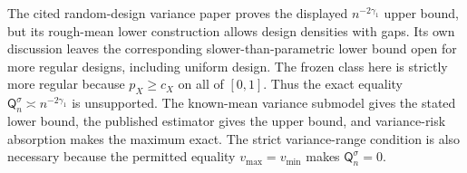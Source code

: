 The cited random-design variance paper proves the displayed \(n^{-2\gamma_1}\) upper bound, but its rough-mean lower construction allows design densities with gaps.  Its own discussion leaves the corresponding slower-than-parametric lower bound open for more regular designs, including uniform design.  The frozen class here is strictly more regular because \(p_X\geq c_X\) on all of \([0,1]\).  Thus the exact equality \(\mathsf Q_n^{\sigma}\asymp n^{-2\gamma_1}\) is unsupported.  The known-mean variance submodel gives the stated lower bound, the published estimator gives the upper bound, and variance-risk absorption makes the maximum exact.  The strict variance-range condition is also necessary because the permitted equality \(v_{\max}=v_{\min}\) makes \(\mathsf Q_n^{\sigma}=0\).